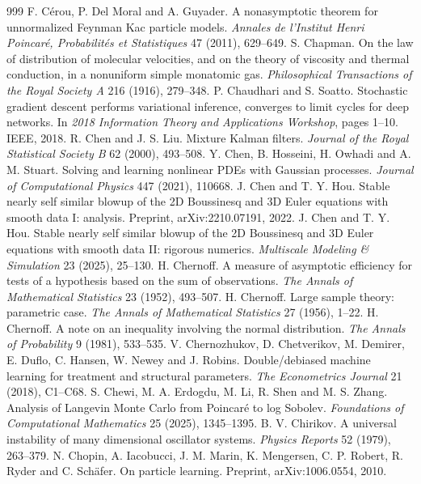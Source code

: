 \begin{thebibliography}{999}
 F. C\'erou, P. Del Moral and A. Guyader. A nonasymptotic theorem for unnormalized Feynman Kac particle models. \emph{Annales de l'Institut Henri Poincar\'e, Probabilit\'es et Statistiques} 47 (2011), 629--649.
 S. Chapman. On the law of distribution of molecular velocities, and on the theory of viscosity and thermal conduction, in a nonuniform simple monatomic gas. \emph{Philosophical Transactions of the Royal Society A} 216 (1916), 279--348.
 P. Chaudhari and S. Soatto. Stochastic gradient descent performs variational inference, converges to limit cycles for deep networks. In \emph{2018 Information Theory and Applications Workshop}, pages 1--10. IEEE, 2018.
 R. Chen and J. S. Liu. Mixture Kalman filters. \emph{Journal of the Royal Statistical Society B} 62 (2000), 493--508.
 Y. Chen, B. Hosseini, H. Owhadi and A. M. Stuart. Solving and learning nonlinear PDEs with Gaussian processes. \emph{Journal of Computational Physics} 447 (2021), 110668.
 J. Chen and T. Y. Hou. Stable nearly self similar blowup of the 2D Boussinesq and 3D Euler equations with smooth data I: analysis. Preprint, arXiv:2210.07191, 2022.
 J. Chen and T. Y. Hou. Stable nearly self similar blowup of the 2D Boussinesq and 3D Euler equations with smooth data II: rigorous numerics. \emph{Multiscale Modeling \& Simulation} 23 (2025), 25--130.
 H. Chernoff. A measure of asymptotic efficiency for tests of a hypothesis based on the sum of observations. \emph{The Annals of Mathematical Statistics} 23 (1952), 493--507.
 H. Chernoff. Large sample theory: parametric case. \emph{The Annals of Mathematical Statistics} 27 (1956), 1--22.
 H. Chernoff. A note on an inequality involving the normal distribution. \emph{The Annals of Probability} 9 (1981), 533--535.
 V. Chernozhukov, D. Chetverikov, M. Demirer, E. Duflo, C. Hansen, W. Newey and J. Robins. Double/debiased machine learning for treatment and structural parameters. \emph{The Econometrics Journal} 21 (2018), C1--C68.
 S. Chewi, M. A. Erdogdu, M. Li, R. Shen and M. S. Zhang. Analysis of Langevin Monte Carlo from Poincar\'e to log Sobolev. \emph{Foundations of Computational Mathematics} 25 (2025), 1345--1395.
 B. V. Chirikov. A universal instability of many dimensional oscillator systems. \emph{Physics Reports} 52 (1979), 263--379.
 N. Chopin, A. Iacobucci, J. M. Marin, K. Mengersen, C. P. Robert, R. Ryder and C. Sch\"afer. On particle learning. Preprint, arXiv:1006.0554, 2010.

\end{thebibliography}
